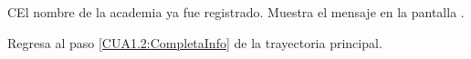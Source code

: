 \begin{UCtrayectoriaA}{C}{El nombre de la academia ya fue registrado.}
	\UCpaso [\UCsist] Muestra el mensaje  en la pantalla .
	
	\UCpaso Regresa al paso \ref{CUA1.2:CompletaInfo} de la trayectoria principal.
\end{UCtrayectoriaA}
